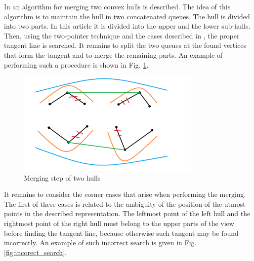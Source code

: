 \documentclass[a4paper,english,numberwithinsect,notab]{eurocg20-submission}
\begin{document}

	
	In \cite{overmars} an algorithm for merging two convex hulls is described. The idea of this algorithm is to maintain the hull in two concatenated queues. The hull is divided into two parts. In this article it is divided into the upper and the lower sub-hulls. Then, using the two-pointer technique and the cases described in \cite{overmars}, the proper tangent line is searched. It remains to split the two queues at the found vertices that form the tangent and to merge the remaining parts. An example of performing such a procedure is shown in Fig. \ref{fig:ch_union}.
	
	\begin{figure}[t]
		\centering
		\includegraphics[width=0.8\textwidth, height=0.3\textheight]{ch_union}
		\caption{Merging step of two hulls}
		\label{fig:ch_union}
	\end{figure}
	
	It remains to consider the corner cases that arise when performing the merging. The first of these cases is related to the ambiguity of the position of the utmost points in the described representation. The leftmost point of the left hull and the rightmost point of the right hull must belong to the upper parts of the view before finding the tangent line, because otherwise such tangent may be found incorrectly. An example of such incorrect search is given in Fig. \ref{fig:incorect_search}.
	
\end{document}
